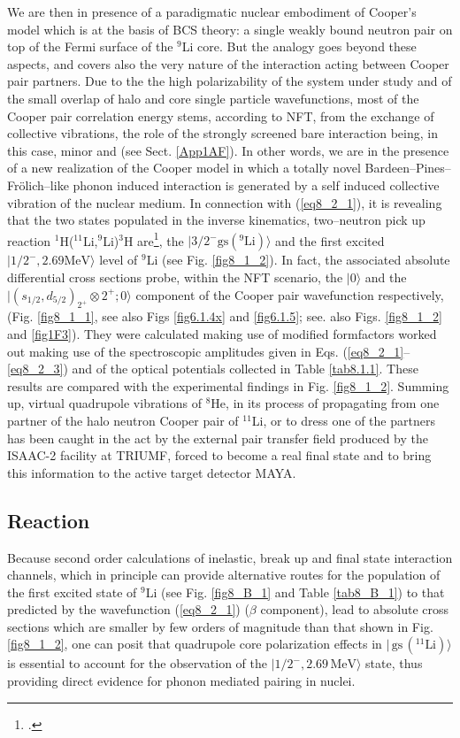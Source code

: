 We are then in presence of a paradigmatic nuclear embodiment of Cooper's model which is at the basis of BCS theory: a single weakly bound neutron pair on top of the Fermi surface of the ${}^9$Li core. But the analogy goes beyond these aspects, and covers also the very nature of the interaction acting between Cooper pair partners. Due to the  the high polarizability of the system under study and of the small overlap of halo and core single particle wavefunctions, most of the Cooper pair correlation energy stems, according to NFT, from the exchange of collective vibrations, the role of the strongly screened bare interaction being, in this case, minor and  (see Sect. \ref{App1AF}). In other words, we are in the presence of a new realization of the Cooper model in which a totally novel Bardeen--Pines--Fr\"olich--like phonon induced interaction is generated by a self induced collective vibration of the nuclear medium. In connection with  (\ref{eq8_2_1}), it is revealing that the two states populated in the  inverse kinematics, two--neutron pick up reaction $^1$H($^{11}$Li,$^9$Li)$^3$H are\footnote{\cite{Tanihata:08}.}, the $|3/2^-\text{gs}(^9\text{Li})\rangle$ and the first excited $|1/2^-,2.69\text{MeV}\rangle$ level of $^9$Li (see Fig. \ref{fig8_1_2}). In fact, the associated absolute differential cross sections probe, within the NFT scenario, the $|0\rangle$  and the $|(s_{1/2},d_{5/2})_{2^+}\otimes 2^+;0\rangle$ component of the Cooper pair wavefunction respectively, (Fig. \ref{fig8_1_1}, see also Figs \ref{fig6.1.4x} and \ref{fig6.1.5}; see. also Figs. \ref{fig8_1_2} and \ref{fig1F3}). They were calculated making use of modified formfactors  worked out making use of the spectroscopic amplitudes given in Eqs. (\ref{eq8_2_1}--\ref{eq8_2_3}) and of the optical potentials collected in Table \ref{tab8.1.1}. These results are compared with the experimental findings in Fig. \ref{fig8_1_2}. Summing up, virtual quadrupole vibrations of $^8$He, in its process of propagating from one partner of the halo neutron Cooper pair of $^{11}$Li, or to dress one of the partners has been caught in the act by the external pair transfer field produced by the ISAAC-2 facility at TRIUMF, forced to become a real final state and to bring this information to the active target detector MAYA.
\subsection{Reaction}\label{C6S1.2}
Because second order calculations of inelastic, break up and final state interaction channels, which in principle can provide alternative routes for the population of the first excited state of $^9$Li (see Fig. \ref{fig8_B_1} and Table \ref{tab8_B_1}) to that predicted by the wavefunction (\ref{eq8_2_1})  ($\beta$ component), lead to absolute cross sections which are smaller by few orders of magnitude than that shown in Fig. \ref{fig8_1_2}, one can posit that quadrupole core polarization effects in $|\,\text{gs}\,(^{11}\text{Li})\rangle$ is essential to account for the observation of the $|1/2^-,2.69\,\text{MeV}\rangle$ state, thus providing
 direct evidence for phonon mediated pairing in nuclei. 
 
